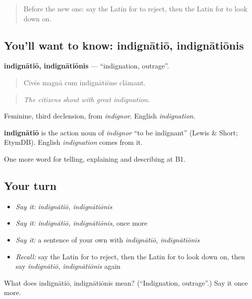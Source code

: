 \begin{quote}
Before the new one: say the Latin for to reject, then the Latin for to look down on.
\end{quote}

\subsection*{You'll want to know: indignātiō, indignātiōnis}
\textbf{indignātiō, indignātiōnis} — \textquotedblleft{}indignation, outrage\textquotedblright{}.

\begin{quote}
Cīvēs magnā cum indignātiōne clāmant.
\end{quote}

\begin{quote}
\emph{The citizens shout with great indignation.}
\end{quote}

Feminine, third declension, from \emph{indignor}. English \emph{indignation}.

\begin{cousinweb}
\textbf{indignātiō} is the action noun of \emph{indignor} \textquotedblleft{}to be indignant\textquotedblright{} (Lewis \& Short; EtymDB). English \emph{indignation} comes from it.
\end{cousinweb}

\begin{grammarlens}[title={What you've built}]
One more word for telling, explaining and describing at B1.
\end{grammarlens}

\subsection*{Your turn}
\begin{itemize}
\raggedright
  \item \emph{Say it:} \emph{indignātiō, indignātiōnis}
  \item \emph{Say it:} \emph{indignātiō, indignātiōnis}, once more
  \item \emph{Say it:} a sentence of your own with \emph{indignātiō, indignātiōnis}
  \item \emph{Recall:} say the Latin for to reject, then the Latin for to look down on, then say \emph{indignātiō, indignātiōnis} again
\end{itemize}

\begin{tcolorbox}[breakable,colback=teal!4,colframe=teal!35!black,title={Before you move on}]
What does indignātiō, indignātiōnis mean? (\textquotedblleft{}Indignation, outrage\textquotedblright{}.) Say it once more.
\end{tcolorbox}

